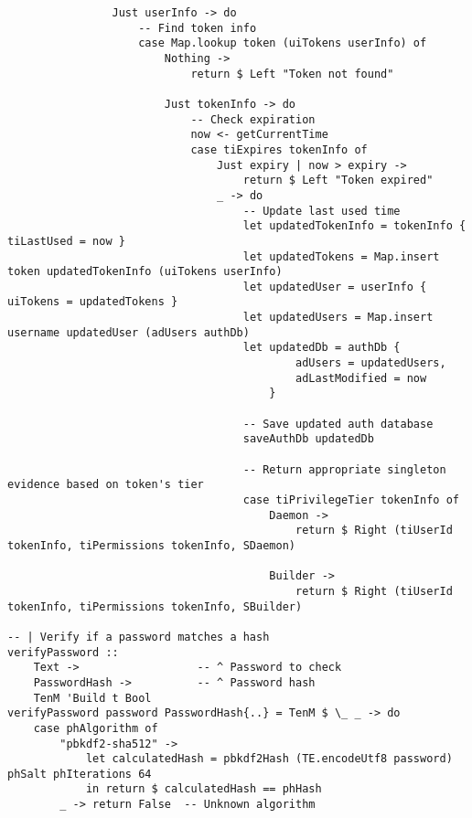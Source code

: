 \documentclass{article}
\begin{document}
\begin{tcolorbox}[title=Ten/Daemon/Auth.hs Changes]
\begin{verbatim}
                Just userInfo -> do
                    -- Find token info
                    case Map.lookup token (uiTokens userInfo) of
                        Nothing ->
                            return $ Left "Token not found"

                        Just tokenInfo -> do
                            -- Check expiration
                            now <- getCurrentTime
                            case tiExpires tokenInfo of
                                Just expiry | now > expiry ->
                                    return $ Left "Token expired"
                                _ -> do
                                    -- Update last used time
                                    let updatedTokenInfo = tokenInfo { tiLastUsed = now }
                                    let updatedTokens = Map.insert token updatedTokenInfo (uiTokens userInfo)
                                    let updatedUser = userInfo { uiTokens = updatedTokens }
                                    let updatedUsers = Map.insert username updatedUser (adUsers authDb)
                                    let updatedDb = authDb {
                                            adUsers = updatedUsers,
                                            adLastModified = now
                                        }

                                    -- Save updated auth database
                                    saveAuthDb updatedDb

                                    -- Return appropriate singleton evidence based on token's tier
                                    case tiPrivilegeTier tokenInfo of
                                        Daemon ->
                                            return $ Right (tiUserId tokenInfo, tiPermissions tokenInfo, SDaemon)

                                        Builder ->
                                            return $ Right (tiUserId tokenInfo, tiPermissions tokenInfo, SBuilder)

-- | Verify if a password matches a hash
verifyPassword ::
    Text ->                  -- ^ Password to check
    PasswordHash ->          -- ^ Password hash
    TenM 'Build t Bool
verifyPassword password PasswordHash{..} = TenM $ \_ _ -> do
    case phAlgorithm of
        "pbkdf2-sha512" ->
            let calculatedHash = pbkdf2Hash (TE.encodeUtf8 password) phSalt phIterations 64
            in return $ calculatedHash == phHash
        _ -> return False  -- Unknown algorithm


\end{verbatim}
\end{tcolorbox}
\end{document}
